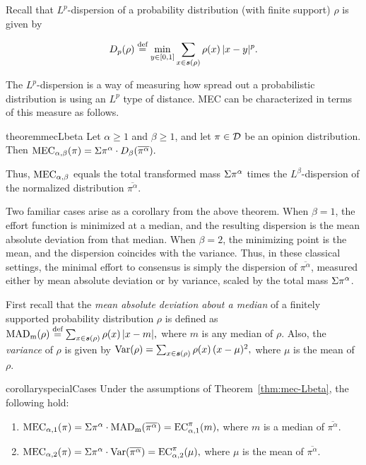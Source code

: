 Recall that $L^p$-dispersion of a probability distribution (with finite support) $\rho$ is given by

\begin{equation}
D_p(\rho)\stackrel{\text{def}}{=} \min_{y\in[0,1]} \sum_{x\in\boldsymbol{s}(\rho)} \rho(x)\,|x-y|^p.
\end{equation}

The $L^p$-dispersion is a way of measuring how spread out a probabilistic distribution is using an $L^p$ type of distance. MEC can be characterized in terms of this measure as follows. 

\begin{restatable}{theorem}{mecLbeta}\label{thm:mec-Lbeta}
Let $\alpha \ge 1$ and $\beta \ge 1$, and let $\pi\in\mathcal{D}$ be an opinion distribution. Then
\(
\MEC[\alpha,\beta](\pi) = \Mass{\pi^\alpha} \cdot D_\beta(\overline {\pi^\alpha}).
\)
\end{restatable}

Thus, $\MEC$ equals the total transformed mass $\Sigma \pi^\alpha$ times the $L^\beta$-dispersion of the normalized distribution $\overline{\pi^\alpha}$.

Two familiar cases arise as a corollary from the above theorem. When $\beta=1$, the effort function
is minimized at a median, and the resulting dispersion is the mean absolute
deviation from that median. When $\beta=2$, the minimizing point is the mean,
and the dispersion coincides with the variance. Thus, in these classical
settings, the minimal effort to consensus is simply the dispersion of
$\overline{\pi^\alpha}$, measured either by mean absolute deviation or by
variance, scaled by the total mass $\Sigma \pi^\alpha$.

First recall that 
the \emph{mean absolute deviation about a median} of a finitely
supported probability distribution $\rho$ is defined as
\(
\mathrm{MAD}_{\mathrm{m}}(\rho)\stackrel{\text{def}}{=} \sum_{x\in\boldsymbol{s}(\rho)} \rho(x)\,|x-m|,
\)
where $m$ is any median of $\rho$.
Also, the \emph{variance} of $\rho$ is given by
\(
\mathrm{Var}(\rho)=\sum_{x\in\boldsymbol{s}(\rho)} \rho(x)\,(x-\mu)^2,
\)
where $\mu$ is the mean of $\rho$.

\begin{restatable}{corollary}{specialCases}\label{cor:mec-special-cases}
Under the assumptions of Theorem~\ref{thm:mec-Lbeta}, the following hold:
\begin{enumerate}
\item 
\(
\MEC[\alpha,1](\pi)
=
\Mass{\pi^\alpha}\cdot \mathrm{MAD}_{\mathrm{m}}(\overline{\pi^\alpha})
=\EC[\alpha,1](m),
\)
where $m$ is a median of $\overline{\pi^\alpha}$.

\item 
\(
\MEC[\alpha,2](\pi)
=
\Mass{\pi^\alpha}\cdot \mathrm{Var}(\overline{\pi^\alpha})
=\EC[\alpha,2](\mu),
\)
where $\mu$ is the mean of $\overline{\pi^\alpha}$.
\end{enumerate}
\end{restatable}

